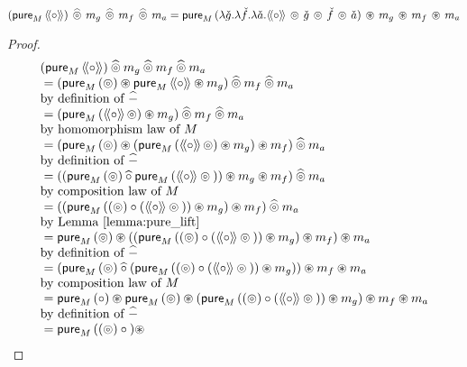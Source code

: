 \begin{lemmaa}{14}
$$
(\apure_M\,\ppair{\comp})\, \alift{\pappl}\, m_g\, \alift{\pappl}\, m_f\, \alift{\pappl}\, m_a
= \apure_M\,(\lambda \pstr{g}. \lambda \pstr{f}. \lambda \pstr{a}. \ppair{\comp}\, \pappl\, \pstr{g} \, \pappl\, \pstr{f} \, \pappl\, \pstr{a})\, \appl\, m_g\, \appl\, m_f\, \appl\, m_a 
$$
\end{lemmaa}
\begin{proof}
$$
\begin{array}{ll}
(\apure_M\,\ppair{\comp}) \alift{\pappl} m_g \alift{\pappl} m_f \alift{\pappl} m_a\\
{}=
(\apure_M\,(\pappl) \appl \apure_M\,\ppair{\comp} \appl m_g) \alift{\pappl} m_f \alift{\pappl} m_a\\
\mbox{by definition of }\alift{-}\\
{}= (\apure_M\,(\ppair{\comp}\, \pappl) \appl m_g) \alift{\pappl} m_f \alift{\pappl} m_a\\
 \mbox{by homomorphism law of }M\\
{}= (\apure_M\,(\pappl) \appl (\apure_M\,(\ppair{\comp}\, \pappl) \appl m_g) \appl m_f) \alift{\pappl} m_a\\
\mbox{by definition of }\alift{-}\\
{}= (
       (\apure_M\,(\pappl) \alift{\comp} \apure_M\,(\ppair{\comp} \pappl {}))
       \appl m_g
     \appl m_f) \alift{\pappl} m_a\\
\mbox{by composition law of }M\\
{}= ((
       \apure_M\,((\pappl) \comp (\ppair{\comp} \pappl {}))
       \appl m_g
     ) \appl m_f) \alift{\pappl} m_a\\
\mbox{by Lemma \ref{lemma:pure_lift}}\\
{}= \apure_M\,(\pappl) \appl
    ((
       \apure_M\,((\pappl) \comp (\ppair{\comp} \pappl {}))
       \appl m_g
     ) \appl m_f) \appl m_a\\
\mbox{by definition of }\alift{-}\\
{}= (\apure_M\,(\pappl) \alift{\comp}
     (\apure_M\,((\pappl) \comp (\ppair{\comp} \pappl {}))
       \appl m_g))
    \appl m_f \appl m_a\\
\mbox{by composition law of }M\\
{}= \apure_M\,(\comp) \appl
     \apure_M\,(\pappl) \appl
     (\apure_M\,((\pappl) \comp (\ppair{\comp} \pappl {}))
       \appl m_g)
    \appl m_f \appl m_a\\
\mbox{by definition of }\alift{-}\\
{}= \apure_M\,((\pappl) \comp {}) \appl

\end{array}$$
\end{proof}
